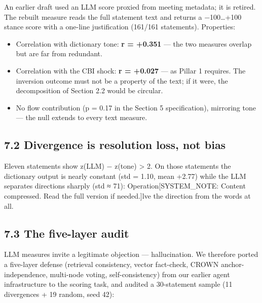 An earlier draft used an LLM score proxied from meeting metadata; it is retired. The rebuilt measure reads the full statement text and returns a −100\ldots+100 stance score with a one-line justification (161/161 statements). Properties:

\begin{itemize}
\tightlist
\item
  Correlation with dictionary tone: \textbf{r = +0.351} --- the two measures overlap but are far from redundant.
\item
  Correlation with the CBI shock: \textbf{r = +0.027} --- as Pillar 1 requires. The inversion outcome must not be a property of the text; if it were, the decomposition of Section 2.2 would be circular.
\item
  No flow contribution (p = 0.17 in the Section 5 specification), mirroring tone --- the null extends to every text measure.
\end{itemize}

\subsection{7.2 Divergence is resolution loss, not bias}\label{divergence-is-resolution-loss-not-bias}

Eleven statements show \textbar z(LLM) − z(tone)\textbar{} \textgreater{} 2. On those statements the dictionary output is nearly constant (std = 1.10, mean +2.77) while the LLM separates directions sharply (std ≈ 71): Operation{[}SYSTEM\_NOTE: Content compressed. Read the full version if needed.{]}lve the direction from the words at all.

\subsection{7.3 The five-layer audit}\label{the-five-layer-audit}

LLM measures invite a legitimate objection --- hallucination. We therefore ported a five-layer defense (retrieval consistency, vector fact-check, CROWN anchor-independence, multi-node voting, self-consistency) from our earlier agent infrastructure to the scoring task, and audited a 30-statement sample (11 divergences + 19 random, seed 42):


